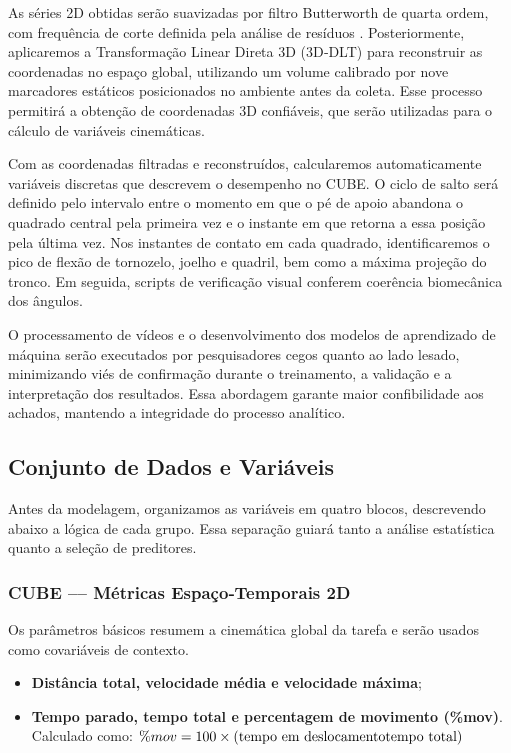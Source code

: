 \documentclass{article}
\begin{document}
As séries 2D obtidas serão suavizadas por filtro Butterworth de quarta ordem, com frequência de corte definida pela análise de resíduos \cite{Winter2009}. Posteriormente, aplicaremos a Transformação Linear Direta 3D (3D‑DLT) para reconstruir as coordenadas no espaço global, utilizando um volume calibrado por nove marcadores estáticos posicionados no ambiente antes da coleta. Esse processo permitirá a obtenção de coordenadas 3D confiáveis, que serão utilizadas para o cálculo de variáveis cinemáticas.%

Com as coordenadas filtradas e reconstruídos, calcularemos automaticamente variáveis discretas que descrevem o desempenho no CUBE. O ciclo de salto será definido pelo intervalo entre o momento em que o pé de apoio abandona o quadrado central pela primeira vez e o instante em que retorna a essa posição pela última vez. Nos instantes de contato em cada quadrado, identificaremos o pico de flexão de tornozelo, joelho e quadril, bem como a máxima projeção do tronco. Em seguida, scripts de verificação visual conferem coerência biomecânica dos ângulos.%

O processamento de vídeos e o desenvolvimento dos modelos de aprendizado de máquina serão executados por pesquisadores cegos quanto ao lado lesado, minimizando viés de confirmação durante o treinamento, a validação e a interpretação dos resultados. Essa abordagem garante maior confibilidade aos achados, mantendo a integridade do processo analítico.%

\subsection{Conjunto de Dados e Variáveis}
Antes da modelagem, organizamos as variáveis em quatro blocos, descrevendo abaixo a lógica de cada grupo. Essa separação guiará tanto a análise estatística quanto a seleção de preditores.%

\subsubsection{CUBE –– Métricas Espaço‑Temporais 2D}
Os parâmetros básicos resumem a cinemática global da tarefa e serão usados como covariáveis de contexto.%
\begin{itemize}
    \item \textbf{Distância total, velocidade média e velocidade máxima};
    \item \textbf{Tempo parado, tempo total e percentagem de movimento (\%mov)}. \\
    Calculado como: $\%mov = 100 \times (\text{tempo em deslocamento} \/ \text{tempo total})$
\end{itemize}
\end{document}
